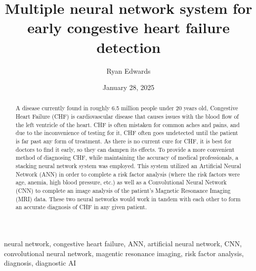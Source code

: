 ﻿\documentclass[12pt,conference,onecolumn]{IEEEtran}
\title{Multiple neural network system for early congestive heart failure detection}
\author{Ryan Edwards}
\date{January 28, 2025}
\begin{document}
\maketitle 

\begin{abstract}
A disease currently found in roughly 6.5 million people under 20 years old, Congestive Heart Failure (CHF) is cardiovascular disease that causes issues with the blood flow of the left ventricle of the heart. CHF is often mistaken for common aches and pains, and due to the inconvenience of testing for it, CHF often goes undetected until the patient is far past any form of treatment. As there is no current cure for CHF, it is best for doctors to find it early, so they can dampen its effects. To provide a more convenient method of diagnosing CHF, while maintaining the accuracy of medical professionals, a stacking neural network system was employed. This system utilized an Artificial Neural Network (ANN) in order to complete a risk factor analysis (where the risk factors were age, anemia, high blood pressure, etc.) as well as a Convolutional Neural Network (CNN) to complete an image analysis of the patient’s Magnetic Resonance Imaging (MRI) data. These two neural networks would work in tandem with each other to form an accurate diagnosis of CHF in any given patient.
\end{abstract}

\begin{IEEEkeywords}
neural network, congestive heart failure, ANN, artificial neural network, CNN, convolutional neural network, magentic resonance imaging, risk factor analysis, diagnosis, diagnostic AI
\end{IEEEkeywords}
\end{document}
